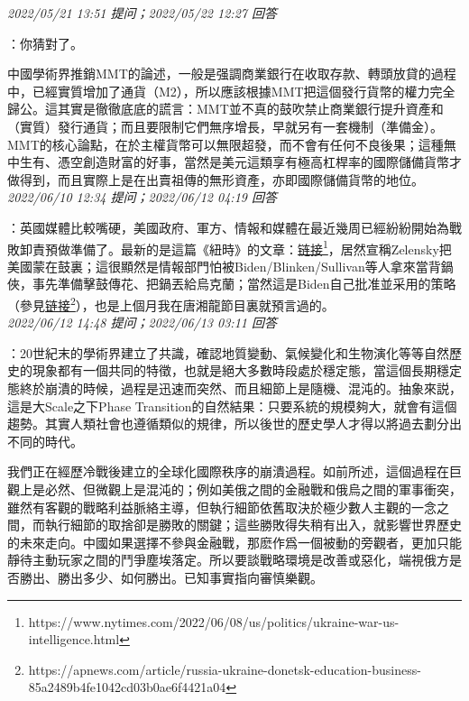 \documentclass[twocolumn]{ctexart}
\begin{document}
\textit{\hfill\noindent\small 2022/05/21 13:51 提问；2022/05/22 12:27 回答}

：你猜對了。

中國學術界推銷MMT的論述，一般是强調商業銀行在收取存款、轉頭放貸的過程中，已經實質增加了通貨（M2），所以應該根據MMT把這個發行貨幣的權力完全歸公。這其實是徹徹底底的謊言：MMT並不真的鼓吹禁止商業銀行提升資產和（實質）發行通貨；而且要限制它們無序增長，早就另有一套機制（準備金）。MMT的核心論點，在於主權貨幣可以無限超發，而不會有任何不良後果；這種無中生有、憑空創造財富的好事，當然是美元這類享有極高杠桿率的國際儲備貨幣才做得到，而且實際上是在出賣祖傳的無形資產，亦即國際儲備貨幣的地位。
\\

\textit{\hfill\noindent\small 2022/06/10 12:34 提问；2022/06/12 04:19 回答}

：英國媒體比較嘴硬，美國政府、軍方、情報和媒體在最近幾周已經紛紛開始為戰敗卸責預做準備了。最新的是這篇《紐時》的文章：\href{https://www.nytimes.com/2022/06/08/us/politics/ukraine-war-us-intelligence.html}{链接\footnote{\url{https://www.nytimes.com/2022/06/08/us/politics/ukraine-war-us-intelligence.html}}}，居然宣稱Zelensky把美國蒙在鼓裏；這很顯然是情報部門怕被Biden/Blinken/Sullivan等人拿來當背鍋俠，事先準備擊鼓傳花、把鍋丟給烏克蘭；當然這是Biden自己批准並采用的策略（參見\href{https://apnews.com/article/russia-ukraine-donetsk-education-business-85a2489b4fe1042cd03b0ae6f4421a04}{链接\footnote{\url{https://apnews.com/article/russia-ukraine-donetsk-education-business-85a2489b4fe1042cd03b0ae6f4421a04}}}），也是上個月我在唐湘龍節目裏就預言過的。
\\

\textit{\hfill\noindent\small 2022/06/12 14:48 提问；2022/06/13 03:11 回答}

：20世紀末的學術界建立了共識，確認地質變動、氣候變化和生物演化等等自然歷史的現象都有一個共同的特徵，也就是絕大多數時段處於穩定態，當這個長期穩定態終於崩潰的時候，過程是迅速而突然、而且細節上是隨機、混沌的。抽象來説，這是大Scale之下Phase Transition的自然結果：只要系統的規模夠大，就會有這個趨勢。其實人類社會也遵循類似的規律，所以後世的歷史學人才得以將過去劃分出不同的時代。

我們正在經歷冷戰後建立的全球化國際秩序的崩潰過程。如前所述，這個過程在巨觀上是必然、但微觀上是混沌的；例如美俄之間的金融戰和俄烏之間的軍事衝突，雖然有客觀的戰略利益脈絡主導，但執行細節依舊取決於極少數人主觀的一念之間，而執行細節的取捨卻是勝敗的關鍵；這些勝敗得失稍有出入，就影響世界歷史的未來走向。中國如果選擇不參與金融戰，那麽作爲一個被動的旁觀者，更加只能靜待主動玩家之間的鬥爭塵埃落定。所以要談戰略環境是改善或惡化，端視俄方是否勝出、勝出多少、如何勝出。已知事實指向審慎樂觀。
\end{document}
